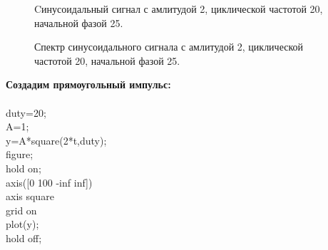 \documentclass[12pt,a4paper]{scrartcl}
\begin{document}
\begin{figure}[h!]
\caption{Cинусоидальный сигнал с амлитудой 2, циклической частотой 20, начальной фазой 25.}
\end{figure}

\begin{figure}[h!]
\caption{Спектр синусоидального сигнала с амлитудой 2, циклической частотой 20, начальной фазой 25.}
\end{figure}

\newpage
\textbf{Создадим прямоугольный импульс:\\\\}
duty=20;\\
A=1;\\

y=A*square(2*t,duty);\\

figure;\\
hold on;\\
axis([0 100 -inf inf])\\
axis square\\
grid on\\
plot(y);\\
hold off;\\
\end{document}
